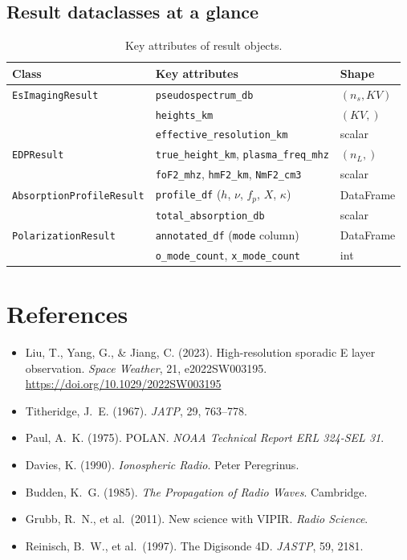 \documentclass[a4paper,11pt]{article}
\begin{document}
\subsection{Result dataclasses at a glance}

\begin{table}[H]
  \centering
  \caption{Key attributes of result objects.}
  \small
  \begin{tabular}{lll}
    \toprule
    Class & Key attributes & Shape \\
    \midrule
    \texttt{EsImagingResult}
      & \texttt{pseudospectrum\_db} & $(n_s, KV)$ \\
      & \texttt{heights\_km}       & $(KV,)$ \\
      & \texttt{effective\_resolution\_km} & scalar \\
    \midrule
    \texttt{EDPResult}
      & \texttt{true\_height\_km}, \texttt{plasma\_freq\_mhz} & $(n_L,)$ \\
      & \texttt{foF2\_mhz}, \texttt{hmF2\_km}, \texttt{NmF2\_cm3} & scalar \\
    \midrule
    \texttt{AbsorptionProfileResult}
      & \texttt{profile\_df} ($h$, $\nu$, $f_p$, $X$, $\kappa$) & DataFrame \\
      & \texttt{total\_absorption\_db} & scalar \\
    \midrule
    \texttt{PolarizationResult}
      & \texttt{annotated\_df} (\texttt{mode} column) & DataFrame \\
      & \texttt{o\_mode\_count}, \texttt{x\_mode\_count} & int \\
    \bottomrule
  \end{tabular}
\end{table}

\section*{References}

\begin{itemize}\small
  \item Liu, T., Yang, G., \& Jiang, C. (2023). High-resolution sporadic E layer
        observation. \textit{Space Weather}, 21, e2022SW003195.
        \url{https://doi.org/10.1029/2022SW003195}
  \item Titheridge, J.\ E. (1967). \textit{JATP}, 29, 763--778.
  \item Paul, A.\ K. (1975). POLAN. \textit{NOAA Technical Report ERL 324-SEL 31}.
  \item Davies, K. (1990). \textit{Ionospheric Radio}. Peter Peregrinus.
  \item Budden, K.\ G. (1985). \textit{The Propagation of Radio Waves}. Cambridge.
  \item Grubb, R.\ N., et al.\ (2011). New science with VIPIR. \textit{Radio Science}.
  \item Reinisch, B.\ W., et al.\ (1997). The Digisonde 4D. \textit{JASTP}, 59, 2181.
\end{itemize}
\end{document}
